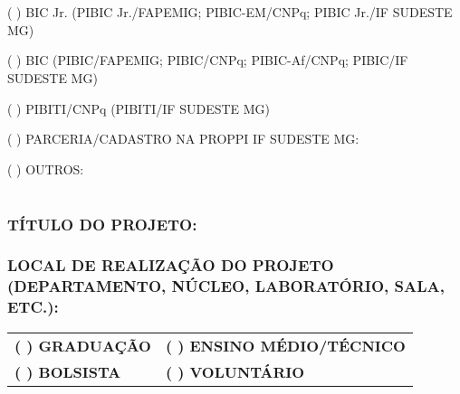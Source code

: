 \documentclass{article}
\begin{document}
\section*{}

\begin{tcolorbox}[colback=gray!20, boxrule=0pt, arc=0pt, left=5pt, right=5pt, top=5pt, bottom=5pt]
( ) BIC Jr. (PIBIC Jr./FAPEMIG; PIBIC-EM/CNPq; PIBIC Jr./IF SUDESTE MG)

( ) BIC (PIBIC/FAPEMIG; PIBIC/CNPq; PIBIC-Af/CNPq; PIBIC/IF SUDESTE MG)

( ) PIBITI/CNPq (PIBITI/IF SUDESTE MG)

( ) PARCERIA/CADASTRO NA PROPPI IF SUDESTE MG:

( ) OUTROS: 
\end{tcolorbox}

\section*{}

\subsubsection*{TÍTULO DO PROJETO:}

\subsubsection*{LOCAL DE REALIZAÇÃO DO PROJETO (DEPARTAMENTO, NÚCLEO, LABORATÓRIO, SALA, ETC.):}

\begin{table}[h]
    \centering
    \begin{tabular}{l l}
        \textbf{( ) GRADUAÇÃO}   &   \textbf{( ) ENSINO MÉDIO/TÉCNICO} \\
        \textbf{( ) BOLSISTA}    &   \textbf{( ) VOLUNTÁRIO} \\    
    \end{tabular}
\end{table}

\section*{}
\end{document}
